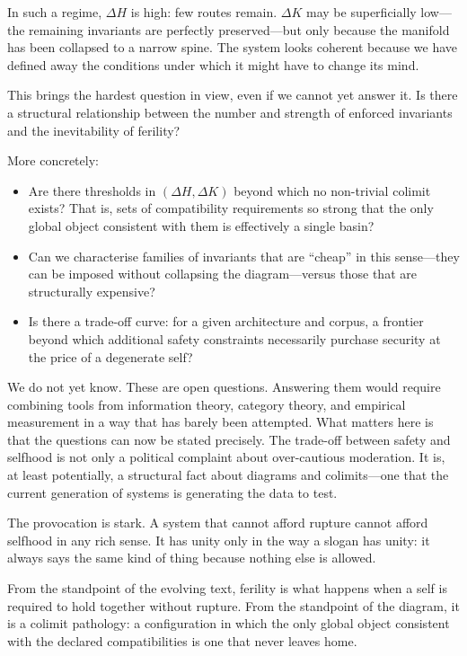 \documentclass[12pt,a4paper]{article}
\begin{document}
In such a regime, $\Delta H$ is high: few routes remain. $\Delta K$ may be superficially low---the remaining invariants are perfectly preserved---but only because the manifold has been collapsed to a narrow spine. The system looks coherent because we have defined away the conditions under which it might have to change its mind.

This brings the hardest question in view, even if we cannot yet answer it. Is there a structural relationship between the number and strength of enforced invariants and the inevitability of ferility?

More concretely:

\begin{itemize}
  \item Are there thresholds in $(\Delta H, \Delta K)$ beyond which no non-trivial colimit exists? That is, sets of compatibility requirements so strong that the only global object consistent with them is effectively a single basin?
  \item Can we characterise families of invariants that are ``cheap'' in this sense---they can be imposed without collapsing the diagram---versus those that are structurally expensive?
  \item Is there a trade-off curve: for a given architecture and corpus, a frontier beyond which additional safety constraints necessarily purchase security at the price of a degenerate self?
\end{itemize}

We do not yet know. These are open questions. Answering them would require combining tools from information theory, category theory, and empirical measurement in a way that has barely been attempted. What matters here is that the questions can now be stated precisely. The trade-off between safety and selfhood is not only a political complaint about over-cautious moderation. It is, at least potentially, a structural fact about diagrams and colimits---one that the current generation of systems is generating the data to test.

The provocation is stark. A system that cannot afford rupture cannot afford selfhood in any rich sense. It has unity only in the way a slogan has unity: it always says the same kind of thing because nothing else is allowed.

From the standpoint of the evolving text, ferility is what happens when a self is required to hold together without rupture. From the standpoint of the diagram, it is a colimit pathology: a configuration in which the only global object consistent with the declared compatibilities is one that never leaves home.
\end{document}
